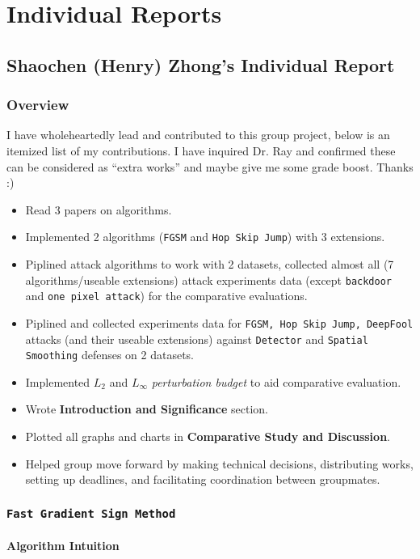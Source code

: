 \documentclass[11pt]{article}
\newcommand{\ilc}{\texttt}
\begin{document}
	
	\section{Individual Reports}
	
	\subsection{Shaochen (Henry) Zhong's Individual Report}
	\subsubsection{Overview}
	
	I have wholeheartedly lead and contributed to this group project, below is an itemized list of my contributions. I have inquired Dr. Ray and confirmed these can be considered as ``extra works'' and maybe give me some grade boost. Thanks :)
	\begin{itemize}
		\item Read 3 papers on algorithms.
		\item Implemented 2 algorithms (\ilc{FGSM} and \ilc{Hop Skip Jump}) with 3 extensions.
		\item Piplined attack algorithms to work with 2 datasets, collected almost all (7 algorithms/useable extensions) attack experiments data (except \ilc{backdoor} and \ilc{one pixel attack}) for the comparative evaluations.
		\item Piplined and collected experiments data for \ilc{FGSM, Hop Skip Jump, DeepFool} attacks (and their useable extensions) against \ilc{Detector} and \ilc{Spatial Smoothing} defenses on 2 datasets.
		\item Implemented $L_2$ and $L_{\infty}$ \textit{perturbation budget} to aid comparative evaluation.
		\item Wrote \textbf{Introduction and Significance} section.
		\item Plotted all graphs and charts in \textbf{Comparative Study and Discussion}.
		\item Helped group move forward by making technical decisions, distributing works, setting up deadlines, and facilitating coordination between groupmates.
	\end{itemize}
	
	\subsubsection{\ilc{Fast Gradient Sign Method}}
	\paragraph{Algorithm Intuition}
	
\end{document}
